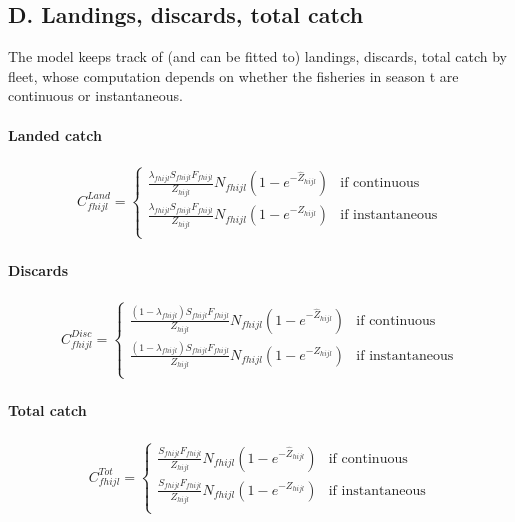 \documentclass[]{article}
\let\oldparagraph\paragraph
\renewcommand{\paragraph}[1]{\oldparagraph{#1}\mbox{}}
\begin{document}
\hypertarget{d.-landings-discards-total-catch}{%
\subsection{D. Landings, discards, total
catch}\label{d.-landings-discards-total-catch}}

The model keeps track of (and can be fitted to) landings, discards,
total catch by fleet, whose computation depends on whether the fisheries
in season t are continuous or instantaneous.

\hypertarget{landed-catch}{%
\paragraph{Landed catch}\label{landed-catch}}

\begin{align}
 C_{fhijl}^{Land} = 
  \begin{cases}
   \frac{\lambda_{fhijl}S_{fhijl}F_{fhijl}}{Z_{hijl}}N_{fhijl}(1-e^{-\hat{Z}_{hijl}}) & \text{if continuous } \\[2ex]
     \frac{\lambda_{fhijl}S_{fhijl}F_{fhijl}}{Z_{hijl}}N_{fhijl}(1-e^{-Z_{hijl}}) & \text{if instantaneous} \\
    \end{cases}
    \end{align}

\hypertarget{discards}{%
\paragraph{Discards}\label{discards}}

\begin{align}
 C_{fhijl}^{Disc} = 
  \begin{cases}
   \frac{(1-\lambda_{fhijl})S_{fhijl}F_{fhijl}}{Z_{hijl}}N_{fhijl}(1-e^{-\hat{Z}_{hijl}}) & \text{if continuous } \\[2ex]
     \frac{(1-\lambda_{fhijl})S_{fhijl}F_{fhijl}}{Z_{hijl}}N_{fhijl}(1-e^{-Z_{hijl}}) & \text{if instantaneous} \\
    \end{cases}
    \end{align}

\hypertarget{total-catch}{%
\paragraph{Total catch}\label{total-catch}}

\begin{align}
 C_{fhijl}^{Tot} = 
  \begin{cases}
   \frac{S_{fhijl}F_{fhijl}}{Z_{hijl}}N_{fhijl}(1-e^{-\hat{Z}_{hijl}}) & \text{if continuous } \\[2ex]
     \frac{S_{fhijl}F_{fhijl}}{Z_{hijl}}N_{fhijl}(1-e^{-Z_{hijl}}) & \text{if instantaneous} \\
    \end{cases}
    \end{align}
\end{document}
